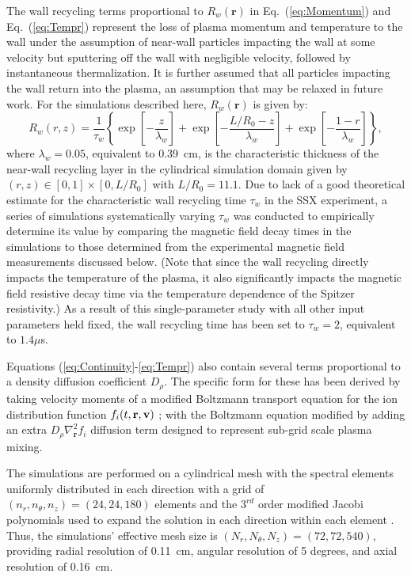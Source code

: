 The wall recycling terms proportional to $R_w(\mathbf{r})$ in Eq.~(\ref{eq:Momentum}) and Eq.~(\ref{eq:Tempr}) represent the loss of plasma momentum and temperature to the wall under the assumption of near-wall particles impacting the wall at some velocity but sputtering off the wall with negligible velocity, followed by instantaneous thermalization.  It is further assumed that all particles impacting the wall return into the plasma, an assumption that may be relaxed in future work.  For the simulations described here, $R_w(\mathbf{r})$ is given by:
\begin{equation} 
R_w(r,z) = \frac{1}{\tau_w}\left\{\exp\left[-\frac{z}{\lambda_w}\right] + \exp\left[-\frac{L/R_0 - z}{\lambda_w}\right] + \exp\left[-\frac{1-r}{\lambda_w}\right]\right\},
\end{equation}
where $\lambda_w= 0.05$, equivalent to 0.39~cm, is the characteristic thickness of the near-wall recycling layer in the cylindrical simulation domain given by $(r,z)\in [0,1]\times[0,L/R_0]$ with $L/R_0=11.1$.  Due to lack of a good theoretical estimate for the characteristic wall recycling time $\tau_w$ in the SSX experiment, a series of simulations systematically varying $\tau_w$ was conducted to empirically determine its value by comparing the magnetic field decay times in the simulations to those determined from the experimental magnetic field measurements discussed below.  (Note that since the wall recycling directly impacts the temperature of the plasma, it also significantly impacts the magnetic field resistive decay time via the temperature dependence of the Spitzer resistivity.)  As a result of this single-parameter study with all other input parameters held fixed, the wall recycling time has been set to $\tau_w=2$, equivalent to $1.4 \mu$s. 

Equations (\ref{eq:Continuity}-\ref{eq:Tempr}) also contain several terms proportional to a density diffusion coefficient $D_\rho$.  The specific form for these has been derived by taking velocity moments of a modified Boltzmann transport equation for the ion distribution function $f_i(t,\mathbf{r},\mathbf{v})$ \cite{Krall86}; with the Boltzmann equation modified by adding an extra $D_\rho\nabla_{\mathbf{r}}^2 f_i$ diffusion term designed to represent sub-grid scale plasma mixing.

The simulations are performed on a cylindrical mesh with the spectral elements uniformly distributed in each direction with a grid of $(n_r,n_\theta,n_z)=(24,24,180)$ elements and the $3^{rd}$ order modified Jacobi polynomials used to expand the solution in each direction within each element \cite{Lukin08}.  Thus, the simulations' effective mesh size is $(N_r,N_\theta,N_z)=(72,72,540)$, providing radial resolution of 0.11~cm, angular resolution of 5 degrees, and axial resolution of 0.16~cm.

